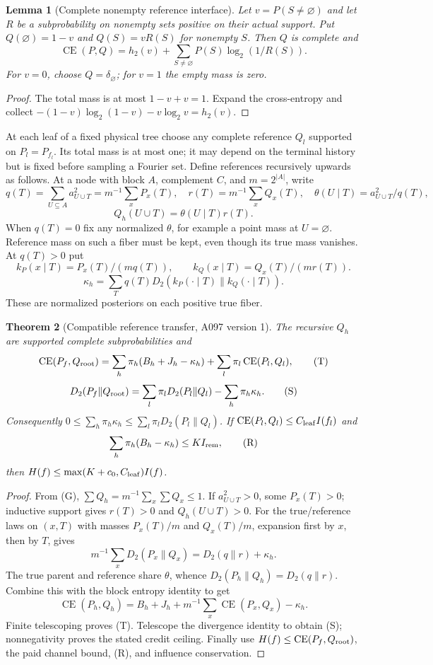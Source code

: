 \documentclass[11pt]{article}
\newtheorem{lemma}{Lemma}
\newtheorem{theorem}[lemma]{Theorem}
\newcommand{\KL}{D_2}
\newcommand{\CE}{\operatorname{CE}}
\begin{document}
\begin{lemma}[Complete nonempty reference interface]
\label{lem:complete}
Let $v=P(S\ne\varnothing)$ and let $R$ be a subprobability on
nonempty sets positive on their actual support. Put
$Q(\varnothing)=1-v$ and $Q(S)=vR(S)$ for nonempty $S$.
Then $Q$ is complete and
\[
\CE(P,Q)=h_2(v)+\sum_{S\ne\varnothing}P(S)\log_2(1/R(S)).
\]
For $v=0$, choose $Q=\delta_\varnothing$; for $v=1$ the empty
mass is zero.
\end{lemma}
\begin{proof}
The total mass is at most $1-v+v=1$. Expand the cross-entropy and
collect $-(1-v)\log_2(1-v)-v\log_2v=h_2(v)$.
\end{proof}

At each leaf of a fixed physical tree choose any complete reference
$Q_l$ supported on $P_l=P_{f_l}$. Its total mass is at most one;
it may depend on the terminal history but is fixed before sampling
a Fourier set. Define references recursively upwards as follows.
At a node with block $A$, complement $C$, and $m=2^{|A|}$, write
\[
q(T)=\sum_{U\subseteq A}a_{U\cup T}^2=m^{-1}\sum_xP_x(T),\quad
r(T)=m^{-1}\sum_xQ_x(T),\quad
\theta(U\mid T)=a_{U\cup T}^2/q(T),
\]
\[
Q_h(U\cup T)=\theta(U\mid T)r(T).\tag{G}\label{eq:G}
\]
When $q(T)=0$ fix any normalized $\theta$, for example a point
mass at $U=\varnothing$. Reference mass on such a fiber must be
kept, even though its true mass vanishes. At $q(T)>0$ put
\[
k_P(x\mid T)=P_x(T)/(mq(T)),\qquad
k_Q(x\mid T)=Q_x(T)/(mr(T)).
\]
\[
\kappa_h=\sum_Tq(T)\KL(k_P(\cdot\mid T)\|k_Q(\cdot\mid T)).
\]
These are normalized posteriors on each positive true fiber.

\begin{theorem}[Compatible reference transfer, A097 version 1]
\label{thm:reference}
The recursive $Q_h$ are supported complete subprobabilities and
\[
\CE(P_f,Q_{\rm root})
=\sum_h\pi_h(B_h+J_h-\kappa_h)+\sum_l\pi_l\CE(P_l,Q_l),\tag{T}
\]
\[
\KL(P_f\|Q_{\rm root})
=\sum_l\pi_l\KL(P_l\|Q_l)-\sum_h\pi_h\kappa_h.\tag{S}
\]
Consequently $0\le\sum_h\pi_h\kappa_h\le
\sum_l\pi_l\KL(P_l\|Q_l)$.
If $\CE(P_l,Q_l)\le C_{\rm leaf}I(f_l)$ and
\[
\sum_h\pi_h(B_h-\kappa_h)\le K I_{\rm rem},\tag{R}\label{eq:R}
\]
then $H(f)\le\max(K+c_0,C_{\rm leaf})I(f)$.
\end{theorem}
\begin{proof}
From (G), $\sum Q_h=m^{-1}\sum_x\sum Q_x\le1$.
If $a_{U\cup T}^2>0$, some $P_x(T)>0$; inductive support gives
$r(T)>0$ and $Q_h(U\cup T)>0$.
For the true/reference laws on $(x,T)$ with masses $P_x(T)/m$
and $Q_x(T)/m$, expansion first by $x$, then by $T$, gives
\[
m^{-1}\sum_x\KL(P_x\|Q_x)=\KL(q\|r)+\kappa_h.
\]
The true parent and reference share $\theta$, whence
$\KL(P_h\|Q_h)=\KL(q\|r)$.
Combine this with the block entropy identity to get
\[
\CE(P_h,Q_h)=B_h+J_h+m^{-1}\sum_x\CE(P_x,Q_x)-\kappa_h.
\]
Finite telescoping proves (T). Telescope the divergence identity
to obtain (S); nonnegativity proves the stated credit ceiling.
Finally use $H(f)\le\CE(P_f,Q_{\rm root})$, the paid channel
bound, (R), and influence conservation.
\end{proof}
\end{document}
